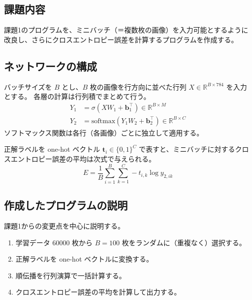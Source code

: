 \documentclass[a4paper,11pt]{ltjsarticle}
\begin{document}
\subsection{課題内容}
課題1のプログラムを、ミニバッチ（＝複数枚の画像）を入力可能とするように改良し、さらにクロスエントロピー誤差を計算するプログラムを作成する。

\subsection{ネットワークの構成}
バッチサイズを $B$ とし、$B$ 枚の画像を行方向に並べた行列 $X \in \mathbb{R}^{B \times 784}$ を入力とする。
各層の計算は行列積でまとめて行う。
\begin{align}
  Y_1 &= \sigma\!\left(X W_1 + \bm{b}_1^{\top}\right) \in \mathbb{R}^{B \times M} \\
  Y_2 &= \mathrm{softmax}\!\left(Y_1 W_2 + \bm{b}_2^{\top}\right) \in \mathbb{R}^{B \times C}
\end{align}
ソフトマックス関数は各行（各画像）ごとに独立して適用する。

正解ラベルを one-hot ベクトル $\bm{t}_i \in \{0,1\}^{C}$ で表すと、ミニバッチに対するクロスエントロピー誤差の平均は次式で与えられる。
\begin{equation}
  E = \frac{1}{B}\sum_{i=1}^{B}\sum_{k=1}^{C} -t_{i,k}\log y_{2,ik}
\end{equation}

\subsection{作成したプログラムの説明}
課題1からの変更点を中心に説明する。

\begin{enumerate}
  \item 学習データ 60000 枚から $B = 100$ 枚をランダムに（重複なく）選択する。
  \item 正解ラベルを one-hot ベクトルに変換する。
  \item 順伝播を行列演算で一括計算する。
  \item クロスエントロピー誤差の平均を計算して出力する。
\end{enumerate}
\end{document}
